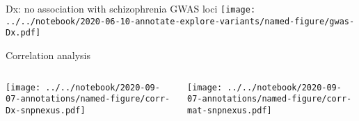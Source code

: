 \documentclass{beamer}
\begin{document}
\begin{frame}{Dx: no association with schizophrenia GWAS loci}
\texttt{[image: ../../notebook/2020-06-10-annotate-explore-variants/named-figure/gwas-Dx.pdf]}
\end{frame}


\begin{frame}{Correlation analysis}
\begin{columns}[t]
\begin{column}{0.4\textwidth}

\texttt{[image: ../../notebook/2020-09-07-annotations/named-figure/corr-Dx-snpnexus.pdf]}
\end{column}

\begin{column}{0.5\textwidth}

\texttt{[image: ../../notebook/2020-09-07-annotations/named-figure/corr-mat-snpnexus.pdf]}
\end{column}
\end{columns}
\end{frame}
\end{document}
